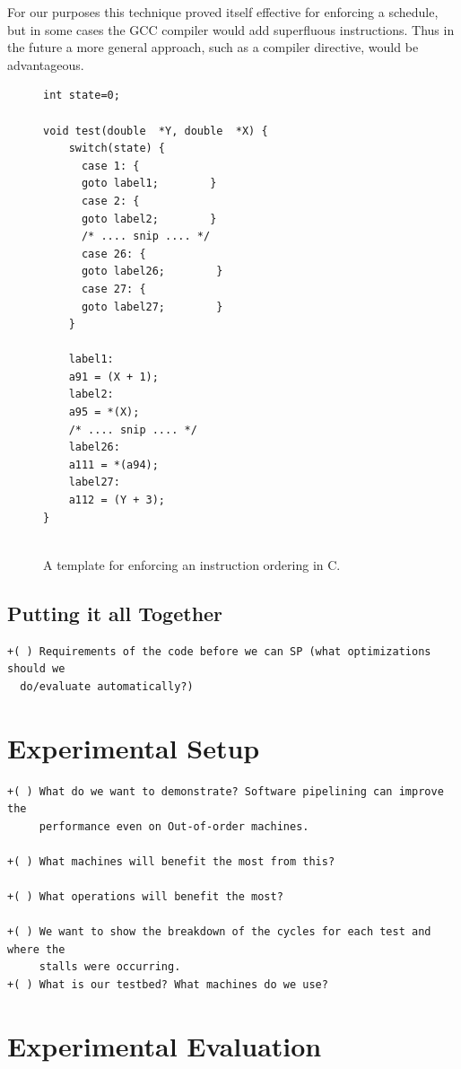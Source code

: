 \documentclass[10pt]{article}
\begin{document}
For our purposes this technique proved itself effective for enforcing a
schedule, but in some cases the GCC compiler would add superfluous instructions. Thus
in the future a more general approach, such as a compiler directive, would be
advantageous.


\begin{figure}[ht]
\begin{lstlisting}
int state=0;

void test(double  *Y, double  *X) {
    switch(state) {
      case 1: {
      goto label1;        }
      case 2: {
      goto label2;        }
      /* .... snip .... */
      case 26: {
      goto label26;        }
      case 27: {
      goto label27;        }
    }

    label1:
    a91 = (X + 1);
    label2:
    a95 = *(X);
    /* .... snip .... */
    label26:
    a111 = *(a94);
    label27:
    a112 = (Y + 3);
}


\end{lstlisting}
\caption{A template for enforcing an instruction ordering in C.}
\label{fig:force_sched}
\end{figure}


\subsection{Putting it all Together}
\begin{verbatim}
+( ) Requirements of the code before we can SP (what optimizations should we
  do/evaluate automatically?)

\end{verbatim}

\section{Experimental Setup}
\begin{verbatim}
+( ) What do we want to demonstrate? Software pipelining can improve the
     performance even on Out-of-order machines.

+( ) What machines will benefit the most from this?

+( ) What operations will benefit the most?

+( ) We want to show the breakdown of the cycles for each test and where the
     stalls were occurring.
+( ) What is our testbed? What machines do we use?
\end{verbatim}


\section{Experimental Evaluation}
\end{document}
